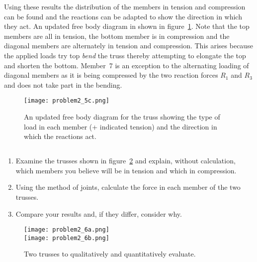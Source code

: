 \documentclass[a4paper,justified,oneside]{tufte-handout}
\numberwithin{equation}{subsection}
\begin{document}
\begin{solution}
Using these results the distribution of the members in tension and compression can be found and the reactions can be adapted to show the direction in which they act. An updated free body diagram in shown in figure~\ref{A3:fig:Q5c}. Note that the top members are all in tension, the bottom member is in compression and the diagonal members are alternately in tension and compression. This arises because the applied loads try top \emph{bend} the truss thereby attempting to elongate the top and shorten the bottom. Member~7 is an exception to the alternating loading of diagonal members as it is being compressed by the two reaction forces $R_1$ and $R_3$ and does not take part in the bending.
\begin{figure}
	\centering
	\texttt{[image: problem2\_5c.png]}
	\caption{An updated free body diagram for the truss showing the type of load in each member (+ indicated tension) and the direction in which the reactions act.}
	\label{A3:fig:Q5c}
\end{figure}
\clearpage
\end{solution}

\subsection{}
\begin{enumerate}
	\item Examine the trusses shown in figure~\ref{A3:fig:Q6ab} and explain, without calculation, which members you believe will be in tension and which in compression.
	\item Using the method of joints, calculate the force in each member of the two trusses.
	\item Compare your results and, if they differ, consider why.
\end{enumerate}
\begin{figure}
	\centering
	\texttt{[image: problem2\_6a.png]}\\
	\texttt{[image: problem2\_6b.png]}
	\caption{Two trusses to qualitatively and quantitatively evaluate.}
	\label{A3:fig:Q6ab}
\end{figure}
\end{document}
